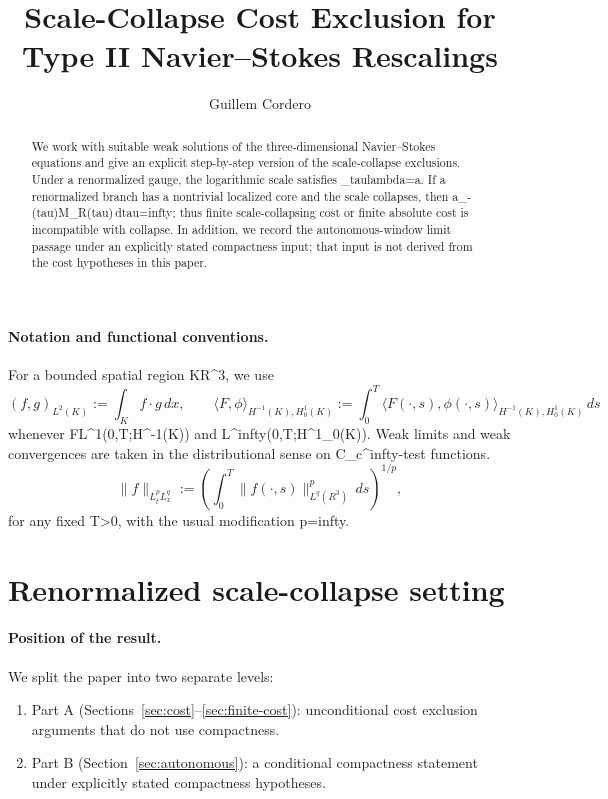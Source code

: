 \documentclass[11pt]{amsart}
\title[Scale Collapse for Type II Rescalings]{Scale-Collapse Cost Exclusion for Type II Navier--Stokes Rescalings}
\author{Guillem Cordero}
\date{}
\def\({}%
\def\){}%
\def\mathbb#1{#1}%
\def\tau{tau}%
\def\lambda{lambda}%
\def\infty{infty}%
\theoremstyle{plain}
\theoremstyle{definition}
\theoremstyle{remark}
\begin{document}
\begin{abstract}
We work with suitable weak solutions of the three-dimensional Navier--Stokes equations and give an explicit step-by-step version of the scale-collapse exclusions.  Under a renormalized gauge, the logarithmic scale satisfies
\(\partial_\tau\log\lambda=a\).  If a renormalized branch has a nontrivial localized core and the scale collapses, then
\(\int a_-(\tau)M_R(\tau)\,d\tau=\infty\); thus finite scale-collapsing cost or finite absolute cost is incompatible with collapse.  In addition, we record the autonomous-window limit passage under an explicitly stated compactness input; that input is not derived from the cost hypotheses in this paper.
\end{abstract}

\maketitle

\paragraph{Notation and functional conventions.}
For a bounded spatial region \(K\subset\mathbb R^3\), we use
\[
  (f,g)_{L^2(K)}:=\int_K f\cdot g\,dx,\qquad
  \langle F,\phi\rangle_{H^{-1}(K),H^1_0(K)}
  :=\int_0^T\langle F(\cdot,s),\phi(\cdot,s)\rangle_{H^{-1}(K),H^1_0(K)}\,ds
\]
whenever \(F\in L^1(0,T;H^{-1}(K))\) and \(\phi\in L^\infty(0,T;H^1_0(K))\). Weak limits and weak convergences are taken in the distributional sense on \(C_c^\infty\)-test functions.
\[
  \|f\|_{L^p_tL^q_x}:=\left(\int_0^T\|f(\cdot,s)\|_{L^q(\mathbb R^3)}^p\,ds\right)^{1/p},
\]
for any fixed \(T>0\), with the usual modification \(p=\infty\).

\section{Renormalized scale-collapse setting}

\paragraph{Position of the result.}
We split the paper into two separate levels:
\begin{enumerate}[label=(\arabic*)]
  \item Part A (Sections~\ref{sec:cost}--\ref{sec:finite-cost}): unconditional cost
    exclusion arguments that do not use compactness.
  \item Part B (Section~\ref{sec:autonomous}): a conditional compactness statement under explicitly
    stated compactness hypotheses.
\end{enumerate}
\end{document}
